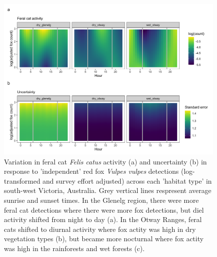 \documentclass[]{elsarticle} %
\begin{document}
\begin{figure}
\includegraphics[width=1\linewidth]{../figs/cat_fox_count} \caption{Variation in feral cat \textit{Felis catus} activity (a) and uncertainty (b) in response to 'independent' red fox \textit{Vulpes vulpes} detections (log-transformed and survey effort adjusted) across each 'habitat type' in south-west Victoria, Australia. Grey vertical lines respresent average sunrise and sunset times. In the Glenelg region, there were more feral cat detections where there were more fox detections, but diel activity shifted from night to day (a). In the Otway Ranges, feral cats shifted to diurnal activity where fox actity was high in dry vegetation types (b), but became more nocturnal where fox actity was high in the rainforests and wet forests (c).}\label{fig:count}
\end{figure}

\newpage
\end{document}
